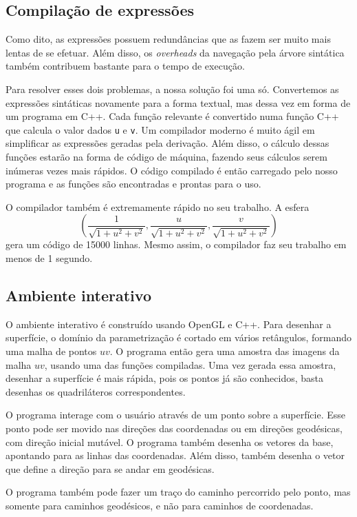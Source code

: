 \documentclass{article}
\begin{document}
\subsection{Compilação de expressões}
Como dito, as expressões possuem redundâncias que as fazem ser muito mais lentas de se efetuar. Além disso, os \textit{overheads} da navegação pela árvore sintática também contribuem bastante para o tempo de execução. 

Para resolver esses dois problemas, a nossa solução foi uma só. Convertemos as expressões sintáticas novamente para a forma textual, mas dessa vez em forma de um programa em C++. Cada função relevante é convertido numa função C++ que calcula o valor dados \texttt{u} e \texttt{v}. Um compilador moderno é muito ágil em simplificar as expressões geradas pela derivação. Além disso, o cálculo dessas funções estarão na forma de código de máquina, fazendo seus cálculos serem inúmeras vezes mais rápidos. O código compilado é então carregado pelo nosso programa e as funções são encontradas e prontas para o uso.

O compilador também é extremamente rápido no seu trabalho. A esfera 
\[\left( \frac{1}{\sqrt{1+u^2+v^2}}, \frac{u}{\sqrt{1+u^2+v^2}}, \frac{v}{\sqrt{1+u^2+v^2}} \right)\]
gera um código de 15000 linhas. Mesmo assim, o compilador faz seu trabalho em menos de 1 segundo. 

\subsection{Ambiente interativo}
O ambiente interativo é construído usando OpenGL e C++. Para desenhar a superfície, o domínio da parametrização é cortado em vários retângulos, formando uma malha de pontos $uv$. O programa então gera uma amostra das imagens da malha $uv$, usando uma das funções compiladas. Uma vez gerada essa amostra, desenhar a superfície é mais rápida, pois os pontos já são conhecidos, basta desenhas os quadriláteros correspondentes.

O programa interage com o usuário através de um ponto sobre a superfície. Esse ponto pode ser movido nas direções das coordenadas ou em direções geodésicas, com direção inicial mutável. O programa também desenha os vetores da base, apontando para as linhas das coordenadas. Além disso, também desenha o vetor que define a direção para se andar em geodésicas.

O programa também pode fazer um traço do caminho percorrido pelo ponto, mas somente para caminhos geodésicos, e não para caminhos de coordenadas.
\end{document}
